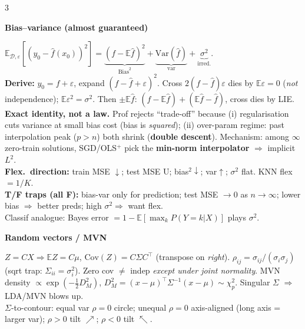\documentclass[a4paper,9pt]{extarticle}
\newcommand{\E}{\mathbb{E}}
\newcommand{\Var}{\mathrm{Var}}
\newcommand{\Cov}{\mathrm{Cov}}
\newcommand{\hd}[1]{\textbf{#1}}
\newcommand{\sect}[1]{\par\vspace{1pt}\noindent\colorbox{black!10}{\parbox{\dimexpr\linewidth-2\fboxsep\relax}{\strut\textbf{#1}\strut}}\par\vspace{1pt}}
\begin{document}
\small
\begin{multicols*}{3}

\sect{Bias--variance (almost guaranteed)}
$\E_{\mathcal D,\varepsilon}[(y_0-\hat f(x_0))^2] = \underbrace{(f-\E\hat f)^2}_{\text{Bias}^2} + \underbrace{\Var(\hat f)}_{\text{var}} + \underbrace{\sigma^2}_{\text{irred.}}$.\\
\hd{Derive:} $y_0=f+\varepsilon$, expand $(f-\hat f+\varepsilon)^2$. Cross $2(f-\hat f)\varepsilon$ dies by $\E\varepsilon=0$ (\emph{not} independence); $\E\varepsilon^2=\sigma^2$. Then $\pm\E\hat f$: $(f-\E\hat f)+(\E\hat f-\hat f)$, cross dies by LIE.\\
\hd{Exact identity, not a law.} Prof rejects ``trade-off'' because (i) regularisation cuts variance at small bias cost (bias is \emph{squared}); (ii) over-param regime: past interpolation peak ($p>n$) both shrink (\hd{double descent}). Mechanism: among $\infty$ zero-train solutions, SGD/OLS$^+$ pick the \hd{min-norm interpolator} $\Rightarrow$ implicit $L^2$.\\
\hd{Flex.\ direction:} train MSE $\downarrow$; test MSE U; bias$^2\downarrow$; var$\uparrow$; $\sigma^2$ flat. KNN flex $=1/K$.\\
\hd{T/F traps (all F):} bias-var only for prediction; test MSE $\to 0$ as $n\to\infty$; lower bias $\Rightarrow$ better preds; high $\sigma^2\Rightarrow$ want flex.\\
Classif analogue: Bayes error $=1-\E[\max_k P(Y\!=\!k|X)]$ plays $\sigma^2$.

\sect{Random vectors / MVN}
$Z=CX\Rightarrow \E Z=C\mu$, $\Cov(Z)=C\Sigma C^\top$ (transpose on \emph{right}).
$\rho_{ij}=\sigma_{ij}/(\sigma_i\sigma_j)$ (sqrt trap: $\Sigma_{ii}=\sigma_i^2$).
Zero cov $\ne$ indep \emph{except under joint normality}. MVN density $\propto\exp(-\tfrac12 D_M^2)$, $D_M^2=(x-\mu)^\top\Sigma^{-1}(x-\mu)\sim\chi^2_p$. Singular $\Sigma$ $\Rightarrow$ LDA/MVN blows up.\\
$\Sigma$-to-contour: equal var $\rho=0$ circle; unequal $\rho=0$ axis-aligned (long axis = larger var); $\rho>0$ tilt $\nearrow$; $\rho<0$ tilt $\nwarrow$.


\end{multicols*}
\end{document}
